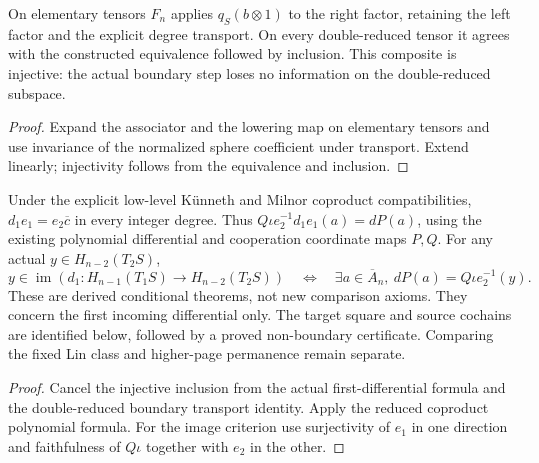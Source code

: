 \begin{proposition}
  \label{prop:h6-double-reduced-boundary-equiv}
  \leanok
  On elementary tensors $F_n$ applies $q_S(b\otimes1)$ to the right
  factor, retaining the left factor and the explicit degree transport.
  On every double-reduced tensor it agrees with the constructed equivalence
  followed by inclusion. This composite is injective: the actual boundary
  step loses no information on the double-reduced subspace.
\end{proposition}
\begin{proof}
  Expand the associator and the lowering map on elementary tensors and
  use invariance of the normalized sphere coefficient under transport.
  Extend linearly; injectivity follows from the equivalence and inclusion.
  \leanok
\end{proof}

\begin{proposition}
  \label{prop:h6-first-incoming-polynomial-comparison}
  \leanok
  Under the explicit low-level K\"unneth and Milnor coproduct
  compatibilities, $d_1e_1=e_2\overline c$ in every integer degree.
  Thus $Q\iota e_2^{-1}d_1e_1(a)=dP(a)$, using the existing polynomial
  differential and cooperation coordinate maps $P,Q$.
  For any actual $y\in H_{n-2}(T_2S)$,
  \[
    y\in\operatorname{im}(d_1:H_{n-1}(T_1S)\to H_{n-2}(T_2S))
    \quad\Longleftrightarrow\quad
    \exists a\in\overline A_n,\ dP(a)=Q\iota e_2^{-1}(y).
  \]
  These are derived conditional theorems, not new comparison axioms.
  They concern the first incoming differential only. The target square
  and source cochains are identified below, followed by a proved
  non-boundary certificate. Comparing the fixed Lin class and higher-page permanence remain separate.
\end{proposition}
\begin{proof}
  Cancel the injective inclusion from the actual first-differential
  formula and the double-reduced boundary transport identity.
  Apply the reduced coproduct polynomial formula. For the image criterion
  use surjectivity of $e_1$ in one direction and faithfulness of $Q\iota$
  together with $e_2$ in the other.
  \leanok
\end{proof}

